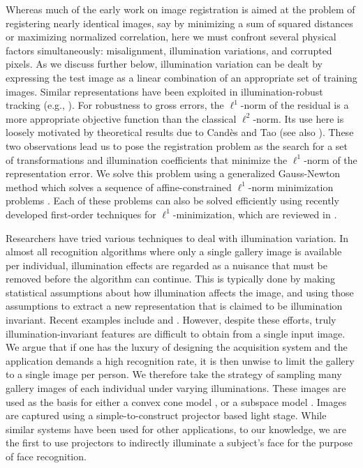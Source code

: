\documentclass[12pt,journal,draftcls,letterpaper,onecolumn]{IEEEtran}
\begin{document}
Whereas much of the early work on image registration is aimed at the
problem of registering nearly identical images, say by minimizing a sum of
squared distances or maximizing normalized correlation, here we must confront several physical factors
simultaneously: misalignment, illumination variations, and corrupted pixels.
As we discuss further below, illumination variation can be dealt by
expressing the test image as a linear combination of an appropriate set of
training images. Similar representations have been exploited in
illumination-robust tracking (e.g., \cite{Belhumeur1999-PAA,Murase1995-IJCV}).
For robustness to gross errors, the $\ell^1$-norm of the residual is a more
appropriate objective function than the classical $\ell^2$-norm. Its use here
is loosely motivated by theoretical results due to Cand\`{e}s and Tao
\cite{CandesE2005-IT} (see also \cite{Wright2008-IT}). These two observations
lead us to pose the registration problem as the search for a set of
transformations and illumination coefficients that minimize the $\ell^1$-norm
of the representation error. We solve this problem using a generalized
Gauss-Newton method which solves a sequence of affine-constrained $\ell^1$-norm
minimization problems \cite{Osborne1990-JAMSSB,Jittorntrum1980-NM}. Each of
these problems can also be solved efficiently using recently developed
first-order techniques for $\ell^1$-minimization, which are reviewed in
\cite{YangA2010-pp}.

Researchers have tried various techniques to deal with illumination variation.
In almost all recognition algorithms where only a single gallery image is
available per individual, illumination effects are regarded as a nuisance that
must be removed before the algorithm can continue.  This is typically done by
making statistical assumptions about how illumination affects the image, and
using those assumptions to extract a new representation that is claimed to be
illumination invariant.  Recent examples include \cite{chen2006total} and
\cite{zhou2007appearance}.  However, despite these efforts, truly
illumination-invariant features are difficult to obtain from a single input
image.  We argue that if one has the luxury of designing the acquisition system 
and the application demands a high recognition rate,
it is then unwise to limit the gallery to a
single image per person.  We therefore take the strategy of sampling many
gallery images of each individual under varying illuminations.  These images
are used as the basis for either a convex cone model
\cite{Georghiades2001-PAMI,belhumeur1998set}, or a subspace model
\cite{Basri2003-PAMI}.  Images are captured using a simple-to-construct
projector based light stage.  While similar systems have been used for
other applications, to our knowledge, we
are the first to use projectors to indirectly illuminate a subject's face for
the purpose of face recognition.
\end{document}
